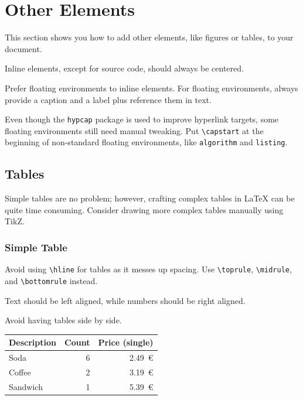 \chapter{Other Elements}
\label{chp:other_elements}

This section shows you how to add other elements, like figures or tables, to your document.

Inline elements, except for source code, should always be centered.

Prefer floating environments to inline elements.
For floating environments, always provide a caption and a label plus reference them in text.

Even though the \texttt{hypcap} package is used to improve hyperlink targets, some floating environments still need manual tweaking.
Put \texttt{\textbackslash{}capstart} at the beginning of non-standard floating environments, like \texttt{algorithm} and \texttt{listing}.

\section{Tables}

Simple tables are no problem; however, crafting complex tables in \LaTeX{} can be quite time consuming.
Consider drawing more complex tables manually using TikZ.

\subsection{Simple Table}

Avoid using \texttt{\textbackslash{}hline} for tables as it messes up spacing.
Use \texttt{\textbackslash{}toprule}, \texttt{\textbackslash{}midrule}, and \texttt{\textbackslash{}bottomrule} instead.

Text should be left aligned, while numbers should be right aligned.

Avoid having tables side by side.

\begin{center}
\begin{tabular}{lrr}
	\toprule
	Description & Count & Price (single)\\
	\midrule
	Soda & 6 & 2.49~€\\
	Coffee & 2 & 3.19~€\\
	Sandwich & 1 & 5.39~€\\
	\bottomrule
\end{tabular}
\end{center}

